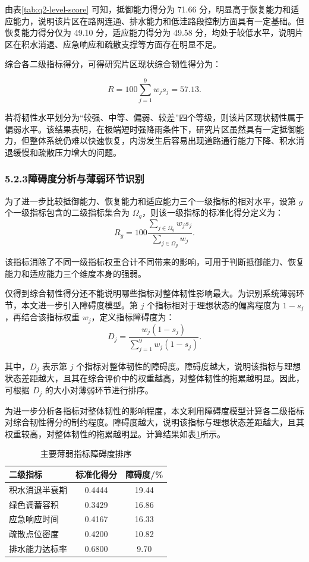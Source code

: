 \documentclass[UTF8,a4paper,12pt]{ctexart}
\begin{document}
由表\ref{tab:q2-level-score} 可知，抵御能力得分为 71.66 分，明显高于恢复能力和适应能力，说明该片区在路网连通、排水能力和低洼路段控制方面具有一定基础。但恢复能力得分仅为 49.10 分，适应能力得分为 49.58 分，均处于较低水平，说明片区在积水消退、应急响应和疏散支撑等方面存在明显不足。

综合各二级指标得分，可得研究片区现状综合韧性得分为：

\[
R=100\sum_{j=1}^{9}w_js_j=57.13.
\]

若将韧性水平划分为“较强、中等、偏弱、较差”四个等级，则该片区现状韧性属于偏弱水平。该结果表明，在极端短时强降雨条件下，研究片区虽然具有一定抵御能力，但整体系统仍难以快速恢复，内涝发生后容易出现道路通行能力下降、积水消退缓慢和疏散压力增大的问题。

\subsubsection{5.2.3障碍度分析与薄弱环节识别}

为了进一步比较抵御能力、恢复能力和适应能力三个一级指标的相对水平，设第 \(g\) 个一级指标包含的二级指标集合为 \(\Omega_g\)，则该一级指标的标准化得分定义为：
\[
R_g=100\frac{\sum_{j\in\Omega_g}w_js_j}{\sum_{j\in\Omega_g}w_j}.
\]

该指标消除了不同一级指标权重合计不同带来的影响，可用于判断抵御能力、恢复能力和适应能力三个维度本身的强弱。

仅得到综合韧性得分还不能说明哪些指标对整体韧性影响最大。为识别系统薄弱环节，本文进一步引入障碍度模型。第 \(j\) 个指标相对于理想状态的偏离程度为 \(1-s_j\)，再结合该指标权重 \(w_j\)，定义指标障碍度为：
\[
D_j=\frac{w_j(1-s_j)}{\sum_{j=1}^{9}w_j(1-s_j)}.
\]

其中，\(D_j\) 表示第 \(j\) 个指标对整体韧性的障碍度。障碍度越大，说明该指标与理想状态差距越大，且其在综合评价中的权重越高，对整体韧性的拖累越明显。因此，可根据 \(D_j\) 的大小对薄弱环节进行排序。

为进一步分析各指标对整体韧性的影响程度，本文利用障碍度模型计算各二级指标对综合韧性得分的制约程度。障碍度越大，说明该指标与理想状态差距越大，且其权重较高，对整体韧性的拖累越明显。计算结果如表\ref{tab:q2-obstacle}所示。

\begin{table}[H]
\centering
\caption{主要薄弱指标障碍度排序}
\label{tab:q2-obstacle}
\begin{tabular}{lcc}
\toprule
二级指标 & 标准化得分 & 障碍度/\% \\
\midrule
积水消退半衰期 & 0.4444 & 19.44 \\
绿色调蓄容积 & 0.3429 & 16.86 \\
应急响应时间 & 0.4167 & 16.33 \\
疏散点位密度 & 0.4200 & 10.82 \\
排水能力达标率 & 0.6800 & 9.70 \\
\bottomrule
\end{tabular}
\end{table}
\end{document}
